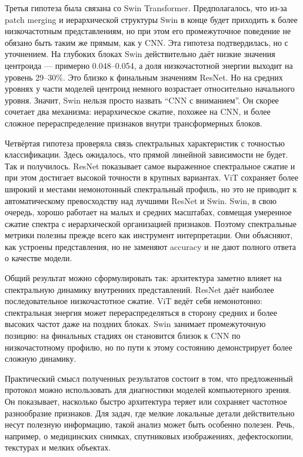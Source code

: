 Третья гипотеза была связана со Swin Transformer. Предполагалось, что из-за patch merging и иерархической структуры Swin в конце будет приходить к более низкочастотным представлениям, но при этом его промежуточное поведение не обязано быть таким же прямым, как у CNN. Эта гипотеза подтвердилась, но с уточнением. На глубоких блоках Swin действительно даёт низкие значения центроида — примерно 0.048--0.054, а доля низкочастотной энергии выходит на уровень 29--30\%. Это близко к финальным значениям ResNet. Но на средних уровнях у части моделей центроид немного возрастает относительно начального уровня. Значит, Swin нельзя просто назвать ``CNN с вниманием''. Он скорее сочетает два механизма: иерархическое сжатие, похожее на CNN, и более сложное перераспределение признаков внутри трансформерных блоков.

Четвёртая гипотеза проверяла связь спектральных характеристик с точностью классификации. Здесь ожидалось, что прямой линейной зависимости не будет. Так и получилось. ResNet показывает самое выраженное спектральное сжатие и при этом достигает высокой точности в крупных вариантах. ViT сохраняет более широкий и местами немонотонный спектральный профиль, но это не приводит к автоматическому превосходству над лучшими ResNet и Swin. Swin, в свою очередь, хорошо работает на малых и средних масштабах, совмещая умеренное сжатие спектра с иерархической организацией признаков. Поэтому спектральные метрики полезны прежде всего как инструмент интерпретации. Они объясняют, как устроены представления, но не заменяют accuracy и не дают полного ответа о качестве модели.

Общий результат можно сформулировать так: архитектура заметно влияет на спектральную динамику внутренних представлений. ResNet даёт наиболее последовательное низкочастотное сжатие. ViT ведёт себя немонотонно: спектральная энергия может перераспределяться в сторону средних и более высоких частот даже на поздних блоках. Swin занимает промежуточную позицию: на финальных стадиях он становится близок к CNN по низкочастотному профилю, но по пути к этому состоянию демонстрирует более сложную динамику.

Практический смысл полученных результатов состоит в том, что предложенный протокол можно использовать для диагностики моделей компьютерного зрения. Он показывает, насколько быстро архитектура теряет или сохраняет частотное разнообразие признаков. Для задач, где мелкие локальные детали действительно несут полезную информацию, такой анализ может быть особенно полезен. Речь, например, о медицинских снимках, спутниковых изображениях, дефектоскопии, текстурах и мелких объектах.

